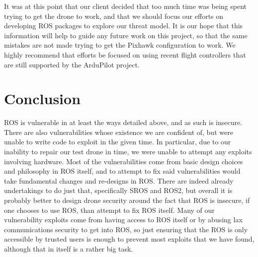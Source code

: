 \documentclass[IEEEtran,letterpaper,10pt,notitlepage,draftclsnofoot]{article}
\begin{document}
It was at this point that our client decided that too much time was being spent trying to get the drone to
work, and that we should focus our efforts on developing ROS packages to explore our threat model. It is our
hope that this information will help to guide any future work on this project, so that the same mistakes are
not made trying to get the Pixhawk configuration to work. We highly recommend that efforts be focused on using
recent flight controllers that are still supported by the ArduPilot project.


\section{Conclusion}
ROS is vulnerable in at least the ways detailed above, and as such is insecure.
There are also vulnerabilities whose existence we are confident of, but were unable to write code to exploit in the given time.
In particular, due to our inability to repair our test drone in time, we were unable to attempt any exploits involving hardware.
Most of the vulnerabilities come from basic design choices and philosophy in ROS itself, and to attempt to fix said vulnerabilities would take fundamental changes and re-designs in ROS.
There are indeed already undertakings to do just that, specifically SROS and ROS2, but overall it is probably better to design drone security around the fact that ROS is insecure, if one chooses to use ROS, than attempt to fix ROS itself.
Many of our vulnerability exploits come from having access to ROS itself or by abusing lax communications security to get into ROS, so just ensuring that the ROS is only accessible by trusted users is enough to prevent most exploits that we have found, although that in itself is a rather big task.



\end{document}
